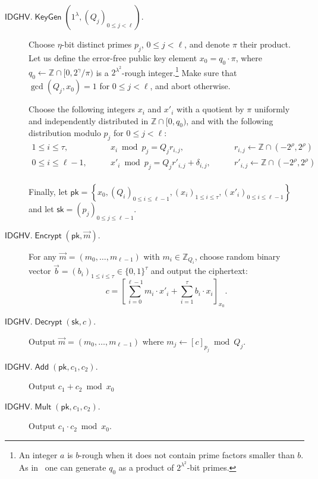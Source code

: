 \documentclass{llncs}
\renewcommand\leq\leqslant
\newcommand{\Z}{{\mathbb Z}}
\DeclareMathOperator{\KeyGen}{\ensuremath{\mathsf{KeyGen}}}
\DeclareMathOperator{\Encrypt}{\ensuremath{\mathsf{Encrypt}}}
\DeclareMathOperator{\Decrypt}{\ensuremath{\mathsf{Decrypt}}}
\DeclareMathOperator{\Add}{\ensuremath{\mathsf{Add}}}
\DeclareMathOperator{\Mult}{\ensuremath{\mathsf{Mult}}}
\newcommand*{\pk}{\ensuremath{\mathsf{pk}}}
\newcommand*{\sk}{\ensuremath{\mathsf{sk}}}
\newcommand*{\CDGHV}{\ensuremath{\mathsf{IDGHV}}}
\begin{document}
\begin{description}\label{CDGHV}
\item[$\CDGHV.\KeyGen(1^\lambda,(Q_j)_{0\leq j <\ell})$.] Choose $\eta$-bit distinct primes $p_j$, $0\leq j<\ell$, and denote $\pi$
their product. Let us define the error-free public key element
$x_0=q_0\cdot\pi$, where $q_0 \gets \Z \cap [0,2^{\gamma}/\pi)$
  is a $2^{\lambda^2}$-rough integer.\footnote{An integer $a$ is $b$-rough when it does
    not contain prime factors smaller than $b$. As in~\cite{CMNT2011} one can
    generate $q_0$ as a product of $2^{\lambda^2}$-bit primes.}  
  Make sure that $\gcd(Q_j,x_0)=1$ for $0\leq j<\ell$, and abort otherwise.
  
  Choose the following integers $x_i$ and $x'_i$ with a quotient by $\pi$ uniformly
  and independently distributed in $\Z\cap [0, q_0)$, and with the
    following distribution modulo $p_j$ for $0 \leq j < \ell$:
$$
\begin{array}{lll}
1 \leq i \leq \tau, & \qquad x_i\bmod p_j = Q_j r_{i,j},& \qquad r_{i,j}
\gets\Z\cap(-2^{\rho}, 2^{\rho}) \\[.2cm]

0\leq i\leq \ell-1, & \qquad x'_i\bmod p_j = Q_jr'_{i,j}+\delta_{i,j}, &
\qquad r'_{i,j}\gets\Z\cap(-2^{\rho}, 2^{\rho}) \\[.2cm]

\end{array}
$$

Finally, let $\pk = \left\{ x_0, \left(Q_i\right)_{0\leq i \leq
  \ell-1},\left(x_i\right)_{1\leq i\leq \tau},\left(x'_i\right)_{0\leq i\leq \ell-1}\right\}$ 
and let $\sk=(p_j)_{0\leq j\leq {\ell-1}}$.
\\\vspace{-0.25cm}
\item[$\CDGHV.\Encrypt(\pk, {\vec{m}})$.] For any
  $\vec{m}=(m_0,\dots,m_{\ell-1})$ with $m_i\in\Z_{Q_i}$, choose
  random binary vector $\vec{b}=(b_i)_{1\leq i \leq \tau}\in
  \{0,1\}^\tau$ and output the ciphertext:
\begin{equation}
\label{eq:enccdghv}
c = \left[\sum\limits_{i=0}^{\ell-1} m_i \cdot x'_i + 
	\sum_{i=1}^\tau 
b_i\cdot x_i\right]_{x_0}.
\end{equation}
\item[$\CDGHV.\Decrypt(\sk, c)$.] Output $\vec{m}=(m_0,\ldots,m_{\ell-1})$ where $m_j \gets [c]_{p_j} \bmod Q_j$.
\\\vspace{-0.25cm}
\item[$\CDGHV.\Add(\pk, c_1, c_2)$.] Output $c_1+c_2 \bmod x_0$
\\\vspace{-0.25cm}
\item[$\CDGHV.\Mult(\pk, c_1, c_2)$.] Output $c_1 \cdot c_2 \bmod x_0$.
\end{description}
\end{document}
